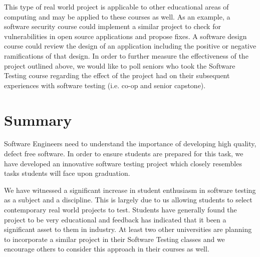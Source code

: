 \documentclass{sig-alternate}
\begin{document}
This type of real world project is applicable to other educational areas of computing and may be applied to these courses as well. As an example, a software security course could implement a similar project to check for vulnerabilities in open source applications and propose fixes. A software design course could review the design of an application including the positive or negative ramifications of that design. In order to further measure the effectiveness of the project outlined above, we would like to poll seniors who took the Software Testing course regarding the effect of the project had on their subsequent experiences with software testing (i.e. co-op and senior capstone).

\section{Summary}
\label{sec: summary}
Software Engineers need to understand the importance of developing high quality, defect free software. In order to ensure students are prepared for this task, we have developed an innovative software testing project which closely resembles tasks students will face upon graduation.

We have witnessed a significant increase in student enthusiasm in software testing as a subject and a discipline. This is largely due to us allowing students to select contemporary real world projects to test. Students have generally found the project to be very educational and feedback has indicated that it been a significant asset to them in industry. At least two other universities are planning to incorporate a similar project in their Software Testing classes and we encourage others to consider this approach in their courses as well.


\balance


\end{document}
